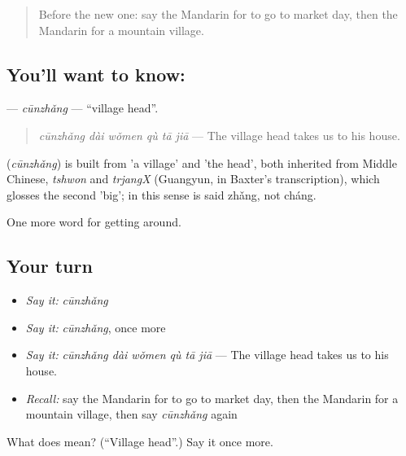 \label{lesson:ZH-C440-cunzhang}



\begin{quote}
Before the new one: say the Mandarin for to go to market day, then the Mandarin for a mountain village.
\end{quote}

\subsection*{You'll want to know: }
\textbf{} — \emph{cūnzhǎng} — \textquotedblleft{}village head\textquotedblright{}.

\begin{quote}
\emph{cūnzhǎng dài wǒmen qù tā jiā} — The village head takes us to his house.
\end{quote}

\begin{cousinweb}
\textbf{} (\emph{cūnzhǎng}) is built from  'a village' and  'the head', both inherited from Middle Chinese, \emph{tshwon} and \emph{trjangX} (Guangyun, in Baxter's transcription), which glosses the second 'big'; in this sense  is said zhǎng, not cháng.
\end{cousinweb}

\begin{grammarlens}[title={What you've built}]
One more word for getting around.
\end{grammarlens}

\subsection*{Your turn}
\begin{itemize}
\raggedright
  \item \emph{Say it:} \emph{cūnzhǎng}
  \item \emph{Say it:} \emph{cūnzhǎng}, once more
  \item \emph{Say it:} \emph{cūnzhǎng dài wǒmen qù tā jiā} — The village head takes us to his house.
  \item \emph{Recall:} say the Mandarin for to go to market day, then the Mandarin for a mountain village, then say \emph{cūnzhǎng} again
\end{itemize}

\begin{tcolorbox}[breakable,colback=teal!4,colframe=teal!35!black,title={Before you move on}]
What does  mean? (\textquotedblleft{}Village head\textquotedblright{}.) Say it once more.
\end{tcolorbox}
